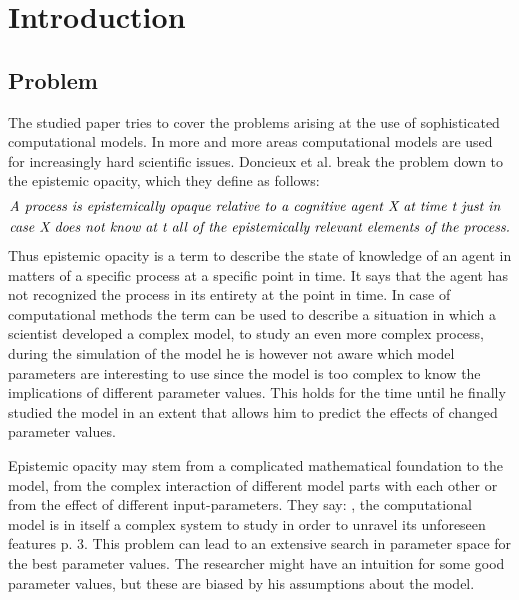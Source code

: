 \documentclass[12pt,twoside]{article}
\theoremstyle{plain}
\theoremstyle{definition}
\theoremstyle{remark}
\begin{document}
\setcounter{tocdepth}{2} 					%
\tableofcontents
{}
\clearpage



\section{Introduction}
\label{sec:introduction}

\subsection{Problem}
The studied paper \cite{doncieux2015multi} tries to cover the problems arising at the use of sophisticated computational models.
In more and more areas computational models are used for increasingly hard scientific issues.
Doncieux et al. break the problem down to the epistemic opacity, which they define as follows:
\begin{align*}
	&\text{\textit{A process is epistemically opaque relative to a cognitive agent X at time t just in}}\\
	&\text{\textit{case X does not know at t all of the epistemically relevant elements of the process.}}
\end{align*}
Thus epistemic opacity is a term to describe the state of knowledge of an agent in matters of a specific process at a specific point in time.
It says that the agent has not recognized the process in its entirety at the point in time.
In case of computational methods the term can be used to describe a situation in which a scientist developed a complex model, to study an even more complex process, during the simulation of the model he is however not aware which model parameters are interesting to use since the model is too complex to know the implications of different parameter values. This holds for the time until he finally studied the model in an extent that allows him to predict the effects of changed parameter values.\medskip

Epistemic opacity may stem from a complicated mathematical foundation to the model, from the complex interaction of different model parts with each other or from the effect of different input-parameters.
They say: \glqq[...], the computational model is in itself a complex system to study in order to unravel its unforeseen features\grqq{} \cite{doncieux2015multi} p. 3.
This problem can lead to an extensive search in parameter space for the \glqq best\grqq{} parameter values.
The researcher might have an intuition for some good parameter values, but these are biased by his assumptions about the model. 
\end{document}
